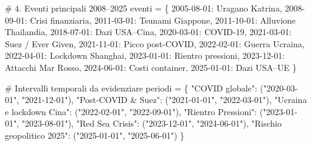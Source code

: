 \documentclass[
  11pt,
  letterpaper,
  DIV=11,
  numbers=noendperiod]{scrartcl}
\newenvironment{Shaded}{\begin{snugshade}}{\end{snugshade}}
\newcommand{\CommentTok}[1]{\textcolor[rgb]{0.37,0.37,0.37}{#1}}
\newcommand{\NormalTok}[1]{\textcolor[rgb]{0.00,0.23,0.31}{#1}}
\newcommand{\OperatorTok}[1]{\textcolor[rgb]{0.37,0.37,0.37}{#1}}
\newcommand{\StringTok}[1]{\textcolor[rgb]{0.13,0.47,0.30}{#1}}
\begin{document}
\begin{Shaded}
\begin{Highlighting}[]
\CommentTok{\# 4. Eventi principali 2008–2025}
\NormalTok{eventi }\OperatorTok{=}\NormalTok{ \{}
    \StringTok{\textquotesingle{}2005{-}08{-}01\textquotesingle{}}\NormalTok{: }\StringTok{\textquotesingle{}Uragano Katrina\textquotesingle{}}\NormalTok{,}
    \StringTok{\textquotesingle{}2008{-}09{-}01\textquotesingle{}}\NormalTok{: }\StringTok{\textquotesingle{}Crisi finanziaria\textquotesingle{}}\NormalTok{,}
    \StringTok{\textquotesingle{}2011{-}03{-}01\textquotesingle{}}\NormalTok{: }\StringTok{\textquotesingle{}Tsunami Giappone\textquotesingle{}}\NormalTok{,}
    \StringTok{\textquotesingle{}2011{-}10{-}01\textquotesingle{}}\NormalTok{: }\StringTok{\textquotesingle{}Alluvione Thailandia\textquotesingle{}}\NormalTok{,}
    \StringTok{\textquotesingle{}2018{-}07{-}01\textquotesingle{}}\NormalTok{: }\StringTok{\textquotesingle{}Dazi USA–Cina\textquotesingle{}}\NormalTok{,}
    \StringTok{\textquotesingle{}2020{-}03{-}01\textquotesingle{}}\NormalTok{: }\StringTok{\textquotesingle{}COVID{-}19\textquotesingle{}}\NormalTok{,}
    \StringTok{\textquotesingle{}2021{-}03{-}01\textquotesingle{}}\NormalTok{: }\StringTok{\textquotesingle{}Suez / Ever Given\textquotesingle{}}\NormalTok{,}
    \StringTok{\textquotesingle{}2021{-}11{-}01\textquotesingle{}}\NormalTok{: }\StringTok{\textquotesingle{}Picco post{-}COVID\textquotesingle{}}\NormalTok{,}
    \StringTok{\textquotesingle{}2022{-}02{-}01\textquotesingle{}}\NormalTok{: }\StringTok{\textquotesingle{}Guerra Ucraina\textquotesingle{}}\NormalTok{,}
    \StringTok{\textquotesingle{}2022{-}04{-}01\textquotesingle{}}\NormalTok{: }\StringTok{\textquotesingle{}Lockdown Shanghai\textquotesingle{}}\NormalTok{,}
    \StringTok{\textquotesingle{}2023{-}01{-}01\textquotesingle{}}\NormalTok{: }\StringTok{\textquotesingle{}Rientro pressioni\textquotesingle{}}\NormalTok{,}
    \StringTok{\textquotesingle{}2023{-}12{-}01\textquotesingle{}}\NormalTok{: }\StringTok{\textquotesingle{}Attacchi Mar Rosso\textquotesingle{}}\NormalTok{,}
    \StringTok{\textquotesingle{}2024{-}06{-}01\textquotesingle{}}\NormalTok{: }\StringTok{\textquotesingle{}Costi container\textquotesingle{}}\NormalTok{,}
    \StringTok{\textquotesingle{}2025{-}01{-}01\textquotesingle{}}\NormalTok{: }\StringTok{\textquotesingle{}Dazi USA–UE\textquotesingle{}}
\NormalTok{\}}

\CommentTok{\# Intervalli temporali da evidenziare}
\NormalTok{periodi }\OperatorTok{=}\NormalTok{ \{}
    \StringTok{"COVID globale"}\NormalTok{: (}\StringTok{"2020{-}03{-}01"}\NormalTok{, }\StringTok{"2021{-}12{-}01"}\NormalTok{),}
    \StringTok{"Post{-}COVID \& Suez"}\NormalTok{: (}\StringTok{"2021{-}01{-}01"}\NormalTok{, }\StringTok{"2022{-}03{-}01"}\NormalTok{),}
    \StringTok{"Ucraina e lockdown Cina"}\NormalTok{: (}\StringTok{"2022{-}02{-}01"}\NormalTok{, }\StringTok{"2022{-}09{-}01"}\NormalTok{),}
    \StringTok{"Rientro Pressioni"}\NormalTok{: (}\StringTok{"2023{-}01{-}01"}\NormalTok{, }\StringTok{"2023{-}08{-}01"}\NormalTok{),}
    \StringTok{"Red Sea Crisis"}\NormalTok{: (}\StringTok{"2023{-}12{-}01"}\NormalTok{, }\StringTok{"2024{-}06{-}01"}\NormalTok{),}
    \StringTok{"Rischio geopolitico 2025"}\NormalTok{: (}\StringTok{"2025{-}01{-}01"}\NormalTok{, }\StringTok{"2025{-}06{-}01"}\NormalTok{)}
\NormalTok{\}}


\end{Highlighting}
\end{Shaded}
\end{document}
